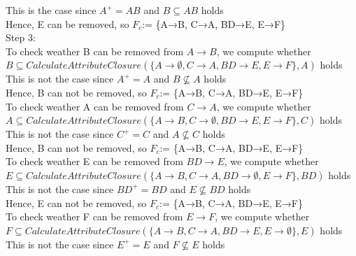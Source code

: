 \documentclass[]{article}
\begin{document}
	This is the case since $A^{+} = AB$ and $B\subseteq AB$ holds  \\
	
	Hence, E can be removed, so $F_{c}$:= \{A→B, C→A, BD→E, E→F\} \\
	
	\noindent Step 3:  \\
	
	To check weather B can be removed from $A\rightarrow B$, we compute whether $B\subseteq CalculateAttributeClosure(\{A\rightarrow \emptyset, C\rightarrow A, BD\rightarrow E, E\rightarrow F\}, A)$ holds \\
	
	This is not the case since $A^{+} = A$ and $B\not\subseteq A$ holds  \\
	
	Hence, B can not be removed, so $F_{c}$:= \{A→B, C→A, BD→E, E→F\} \\
	
	To check weather A can be removed from $C\rightarrow A$, we compute whether $A\subseteq CalculateAttributeClosure(\{A\rightarrow B, C\rightarrow \emptyset, BD\rightarrow E, E\rightarrow F\}, C)$ holds \\
	
	This is not the case since $C^{+} = C$ and $A\not\subseteq C$ holds  \\
	
	Hence, B can not be removed, so $F_{c}$:= \{A→B, C→A, BD→E, E→F\} \\
	
	To check weather E can be removed from $BD\rightarrow E$, we compute whether $E\subseteq CalculateAttributeClosure(\{A\rightarrow B, C\rightarrow A, BD\rightarrow \emptyset, E\rightarrow F\}, BD)$ holds \\
	
	This is not the case since $BD^{+} = BD$ and $E\not\subseteq BD$ holds  \\
	
	Hence, E can not be removed, so $F_{c}$:= \{A→B, C→A, BD→E, E→F\} \\
	
	To check weather F can be removed from $E\rightarrow F$, we compute whether $F\subseteq CalculateAttributeClosure(\{A\rightarrow B, C\rightarrow A, BD\rightarrow E, E\rightarrow \emptyset\}, E)$ holds \\
	
	This is not the case since $E^{+} = E$ and $F\not\subseteq E$ holds  \\
	
\end{document}
